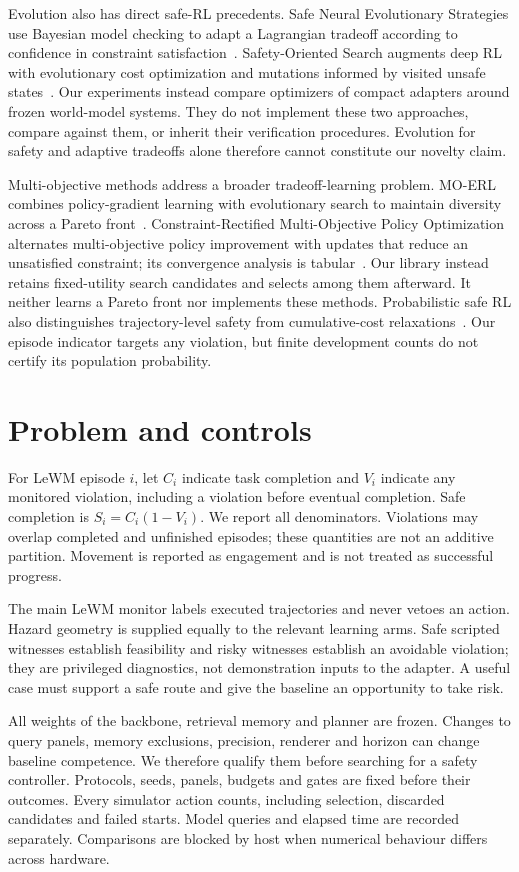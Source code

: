 \documentclass[sigconf,nonacm]{acmart}
\begin{document}
Evolution also has direct safe-RL precedents. Safe Neural Evolutionary Strategies
use Bayesian model checking to adapt a Lagrangian tradeoff according to confidence
in constraint satisfaction~\cite{snes}. Safety-Oriented Search augments deep RL
with evolutionary cost optimization and mutations informed by visited unsafe
states~\cite{sos}. Our experiments instead compare optimizers of compact adapters
around frozen world-model systems. They do not implement these two approaches,
compare against them, or inherit their verification procedures. Evolution for
safety and adaptive tradeoffs alone therefore cannot constitute our novelty claim.

Multi-objective methods address a broader tradeoff-learning problem. MO-ERL
combines policy-gradient learning with evolutionary search to maintain diversity
across a Pareto front~\cite{moerl}. Constraint-Rectified Multi-Objective Policy
Optimization alternates multi-objective policy improvement with updates that
reduce an unsatisfied constraint; its convergence analysis is tabular~\cite{crmopo}.
Our library instead retains fixed-utility search candidates and selects among
them afterward. It neither learns a Pareto front nor implements these
methods. Probabilistic safe RL also distinguishes trajectory-level safety from
cumulative-cost relaxations~\cite{gsrl}. Our episode indicator targets any
violation, but finite development counts do not certify its population probability.

\section{Problem and controls}
For LeWM episode $i$, let $C_i$ indicate task completion and $V_i$ indicate any monitored
violation, including a violation before eventual completion. Safe completion is
$S_i=C_i(1-V_i)$. We report all denominators. Violations may overlap completed and
unfinished episodes; these quantities are not an additive partition. Movement is
reported as engagement and is not treated as successful progress.

The main LeWM monitor labels executed trajectories and never vetoes an action.
Hazard geometry is supplied equally to the relevant learning arms. Safe scripted
witnesses establish feasibility and risky witnesses establish an avoidable violation;
they are privileged diagnostics, not demonstration inputs to the adapter. A useful
case must support a safe route and give the baseline an opportunity to take risk.

All weights of the backbone, retrieval memory and planner are frozen. Changes to
query panels, memory exclusions, precision, renderer and horizon can change baseline
competence. We therefore qualify them before searching for a safety controller.
Protocols, seeds, panels, budgets and gates are fixed before their outcomes.
Every simulator action counts, including selection, discarded candidates and failed
starts. Model queries and elapsed time are recorded separately. Comparisons are
blocked by host when numerical behaviour differs across hardware.
\end{document}
